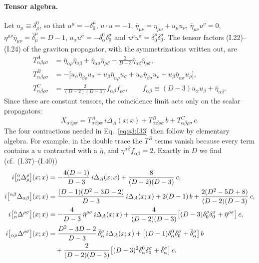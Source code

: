 \documentclass[aps,prd,onecolumn,10pt,nofootinbib,floatfix]{revtex4-2}
\newcommand{\eqI}[1]{(I.#1)}
\begin{document}
\paragraph*{Tensor algebra.}
Let $u_\mu\equiv\delta^0_\mu$, so that $u^\mu=-\delta^\mu_0$, $u\cdot u=-1$,
$\bar\eta_{\mu\nu}=\eta_{\mu\nu}+u_\mu u_\nu$, $\bar\eta_{\mu\nu}u^\nu=0$,
$\eta^{\mu\nu}\bar\eta_{\mu\nu}=\bar\delta^\mu_\mu=D-1$, $u_\alpha u^\sigma=-\delta^0_\alpha\delta^\sigma_0$
and $u^\rho u^\sigma=\delta^\rho_0\delta^\sigma_0$. The tensor factors \eqI{22}--\eqI{24} of the
graviton propagator, with the symmetrizations written out, are
\begin{equation}\label{eq:s3:T}
\begin{aligned}
T^A_{\alpha\beta\rho\sigma}&=\bar\eta_{\alpha\rho}\bar\eta_{\sigma\beta}+\bar\eta_{\alpha\sigma}\bar\eta_{\rho\beta}
-\tfrac{2}{D-3}\bar\eta_{\alpha\beta}\bar\eta_{\rho\sigma},\\
T^B_{\alpha\beta\rho\sigma}&=-\bigl[u_\alpha\bar\eta_{\beta\rho}u_\sigma+u_\beta\bar\eta_{\alpha\rho}u_\sigma
+u_\alpha\bar\eta_{\beta\sigma}u_\rho+u_\beta\bar\eta_{\alpha\sigma}u_\rho\bigr],\\
T^C_{\alpha\beta\rho\sigma}&=\tfrac{2}{(D-2)(D-3)}f_{\alpha\beta}f_{\rho\sigma},\qquad
f_{\alpha\beta}\equiv(D-3)u_\alpha u_\beta+\bar\eta_{\alpha\beta}.
\end{aligned}
\end{equation}
Since these are constant tensors, the coincidence limit acts only on the scalar propagators:
\begin{equation}\label{eq:s3:Xdecomp}
X_{\alpha\beta\rho\sigma}=T^A_{\alpha\beta\rho\sigma}\,i\Delta_A(x;x)+T^B_{\alpha\beta\rho\sigma}\,b
+T^C_{\alpha\beta\rho\sigma}\,c .
\end{equation}
The four contractions needed in Eq.~\eqref{eq:s3:I33} then follow by elementary algebra. For
example, in the double trace the $T^B$ terms vanish because every term contains a $u$ contracted
with a $\bar\eta$, and $\eta^{\alpha\beta}f_{\alpha\beta}=2$. Exactly in $D$ we find
(cf.\ \eqI{37}--\eqI{40})
\begin{align}
i\bigl[{}^\alpha_\alpha\Delta^\rho_\rho\bigr](x;x)&=-\frac{4(D-1)}{D-3}\,i\Delta_A(x;x)+\frac{8}{(D-2)(D-3)}\,c,
\label{eq:s3:I37}\\
i\bigl[{}^{\alpha\beta}\Delta_{\alpha\beta}\bigr](x;x)&=\frac{(D-1)(D^2-3D-2)}{D-3}\,i\Delta_A(x;x)
+2(D-1)\,b+\frac{2(D^2-5D+8)}{(D-2)(D-3)}\,c,\label{eq:s3:I38}\\
i\bigl[{}^\alpha_\alpha\Delta^{\rho\sigma}\bigr](x;x)&=-\frac{4}{D-3}\,\bar\eta^{\rho\sigma}\,i\Delta_A(x;x)
+\frac{4}{(D-2)(D-3)}\bigl[(D-3)\delta^\rho_0\delta^\sigma_0+\bar\eta^{\rho\sigma}\bigr]\,c,\label{eq:s3:I39}\\
i\bigl[{}_{\alpha\rho}\Delta^{\rho\sigma}\bigr](x;x)&=\frac{D^2-3D-2}{D-3}\,\bar\delta^\sigma_\alpha\,i\Delta_A(x;x)
+\bigl[(D-1)\delta^0_\alpha\delta^\sigma_0+\bar\delta^\sigma_\alpha\bigr]\,b\notag\\
&\quad+\frac{2}{(D-2)(D-3)}\bigl[(D-3)^2\delta^0_\alpha\delta^\sigma_0+\bar\delta^\sigma_\alpha\bigr]\,c.
\label{eq:s3:I40}
\end{align}
\end{document}
